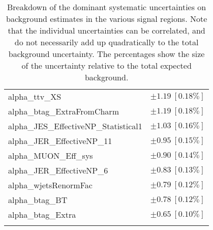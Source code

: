\begin{table}
\begin{center}
\begin{tabular*}{\textwidth}{@{\extracolsep{\fill}}lc}
alpha\_ttv\_XS         & $\pm 1.19\ [0.18\%] $       \\
alpha\_btag\_ExtraFromCharm         & $\pm 1.19\ [0.18\%] $       \\
alpha\_JES\_EffectiveNP\_Statistical1         & $\pm 1.03\ [0.16\%] $       \\
alpha\_JER\_EffectiveNP\_11         & $\pm 0.95\ [0.15\%] $       \\
alpha\_MUON\_Eff\_sys         & $\pm 0.90\ [0.14\%] $       \\
alpha\_JER\_EffectiveNP\_6         & $\pm 0.83\ [0.13\%] $       \\
alpha\_wjetsRenormFac         & $\pm 0.79\ [0.12\%] $       \\
alpha\_btag\_BT         & $\pm 0.78\ [0.12\%] $       \\
alpha\_btag\_Extra         & $\pm 0.65\ [0.10\%] $       \\
\noalign{\smallskip}\hline\noalign{\smallskip}
\end{tabular*}
\end{center}
\caption[Breakdown of uncertainty on background estimates]{
Breakdown of the dominant systematic uncertainties on background estimates in the various signal regions.
Note that the individual uncertainties can be correlated, and do not necessarily add up quadratically to 
the total background uncertainty. The percentages show the size of the uncertainty relative to the total expected background.
\label{table.results.bkgestimate.uncertainties.TRHMEM_cuts}}
\end{table}
%